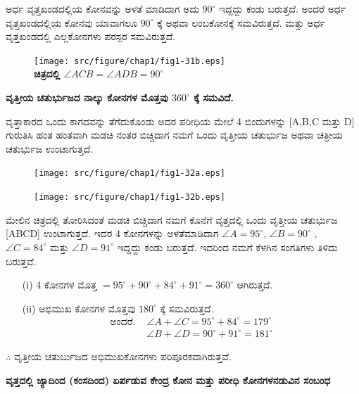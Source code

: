 \begin{itemize}
 ಅರ್ಧ  ವೃತ್ತಖಂಡದಲ್ಲಿಯ ಕೋನವನ್ನು ಅಳತೆ ಮಾಡಿದಾಗ ಅದು $90^\circ$ ಇದ್ದದ್ದು ಕಂಡು ಬರುತ್ತದೆ. ಅಂದರೆ ಅರ್ಧ ವೃತ್ತಖಂಡದಲ್ಲಿಯ ಕೋನವು ಯಾವಾಗಲೂ $90^\circ$ ಕ್ಕೆ ಅಥವಾ ಲಂಬಕೋನಕ್ಕೆ ಸಮವಿರುತ್ತದೆ. ಮತ್ತು ಅರ್ಧ ವೃತ್ತಖಂಡದಲ್ಲಿ ಎಲ್ಲಕೋನಗಳು ಪರಸ್ಪರ ಸಮವಿರುತ್ತದೆ. 
   \begin{figure}[H]
\centering
\texttt{[image: src/figure/chap1/fig1-31b.eps]}\\
\textbf{ಚಿತ್ರದಲ್ಲಿ \quad $\angle ACB = \angle ADB = 90^\circ$}
\end{figure}
  \end{itemize}
   
   \noindent
   \textbf{ವೃತ್ತೀಯ ಚತುರ್ಭುಜದ ನಾಲ್ಕು ಕೋನಗಳ ಮೊತ್ತವು $360^\circ$ ಕ್ಕೆ ಸಮವಿದೆ.}
   
   ವೃತ್ತಾಕಾರದ ಒಂದು ಕಾಗದವನ್ನು ತೆಗೆದುಕೊಂಡು ಅದರ ಪರೀಧಿಯ ಮೇಲೆ 4 ಬಿಂದುಗಳನ್ನು [A,B,C ಮತ್ತು  D] ಗುರುತಿಸಿ ಹಂತ ಹಂತವಾಗಿ ಮಡಚಿ ನಂತರ ಬಿಚ್ಚಿದಾಗ ನಮಗೆ ಒಂದು ವೃತ್ತೀಯ ಚತುರ್ಭುಜ ಅಥವಾ ಚತ್ರೀಯ ಚತುರ್ಭುಜ ಉಂಟಾಗುತ್ತದೆ. 
      \begin{figure}[H]
\centering
\texttt{[image: src/figure/chap1/fig1-32a.eps]}
\end{figure}
      \begin{figure}[H]
\centering
\texttt{[image: src/figure/chap1/fig1-32b.eps]}
\end{figure}
 
 ಮೇಲಿನ ಚಿತ್ರದಲ್ಲಿ ತೋರಿಸಿದಂತೆ ಮಡಚಿ ಬಿಚ್ಚಿದಾಗ ನಮಗೆ ಕೊನೆಗೆ ವೃತ್ತದಲ್ಲಿ ಒಂದು ವೃತ್ತೀಯ ಚತುರ್ಭುಜ [ABCD] ಉಂಟಾಗುತ್ತದೆ. ಇದರ 4 ಕೋನಗಳನ್ನು ಅಳತೆಮಾಡಿದಾಗ  $\angle A = 95^\circ$, $\angle B = 90^\circ$ , $\angle C = 84^\circ$ ಮತ್ತು $\angle D = 91^\circ$ ಇದ್ದದ್ದು ಕಂಡು ಬರುತ್ತದೆ. ಇದರಿಂದ ನಮಗೆ ಕೆಳಗಿನ ಸಂಗತಿಗಳು ತಿಳಿದು ಬರುತ್ತವೆ.
 \begin{itemize}
 \item[(i)] 4 ಕೋನಗಳ ಮೊತ್ತ $= 95^\circ + 90^\circ + 84^\circ + 91^\circ =360^\circ $ ಆಗಿರುತ್ತದೆ. 
 
 \item[(ii)] ಅಭಿಮುಖ ಕೋನಗಳ ಮೊತ್ತವು  $180^\circ$ ಕ್ಕೆ  ಸಮವಿರುತ್ತದೆ. 
 \begin{align*}
 \text{ಅಂದರೆ. } & \angle A + \angle C = 95^\circ + 84^\circ = 179^\circ \\
 & \angle  B + \angle  D = 90^\circ + 91^\circ = 181^\circ
 \end{align*}
 \end{itemize}
 
 $\therefore$ ವೃತ್ತೀಯ ಚತುರ್ಬುಜದ ಅಭಿಮುಖಕೋನಗಳು ಪರಿಪೂರಕವಾಗಿರುತ್ತವೆ. 
  
 \noindent
 \textbf{ವೃತ್ತದಲ್ಲಿ ಜ್ಯಾದಿಂದ (ಕಂಸದಿಂದ) ಏರ್ಪಡುವ ಕೇಂದ್ರ ಕೋನ ಮತ್ತು ಪರೀಧಿ ಕೋನಗಳ\break ನಡುವಿನ ಸಂಬಂಧ}
 
